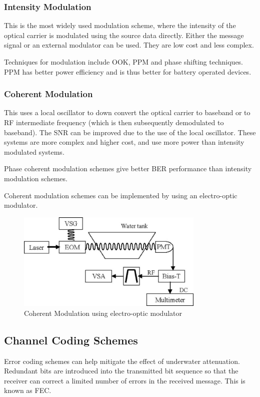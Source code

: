 \documentclass{article}
\begin{document}
\subsubsection{Intensity Modulation}
This is the most widely used modulation scheme, where the intensity of the
optical carrier is modulated using the source data directly. Either the
message signal or an external modulator can be used. They are low cost and
less complex.

Techniques for modulation include \ac{OOK}, \ac{PPM} and phase shifting
techniques. \ac{PPM} has better power efficiency and is thus better for
battery operated devices.

\subsubsection{Coherent Modulation}
This uses a local oscillator to down convert the optical carrier to baseband
or to \ac{RF} intermediate frequency (which is then subsequently demodulated
to baseband). The \ac{SNR} can be improved due to the use of the local
oscillator. These systems are more complex and higher cost, and use more power
than intensity modulated systems.

Phase coherent modulation schemes give better \ac{BER} performance than
intensity modulation schemes.

Coherent modulation schemes can be implemented by using an electro-optic
modulator.

\begin{figure}[H]
  \includegraphics[width=0.8\textwidth]{coherent-source.jpg}
  \caption{Coherent Modulation using electro-optic modulator
	   \cite{cochenour_mullen_laux_2007}}
  \label{fig:boat1}
\end{figure}

\subsection{Channel Coding Schemes}
Error coding schemes can help mitigate the effect of underwater attenuation.
Redundant bits are introduced into the transmitted bit sequence so that the
receiver can correct a limited number of errors in the received message.
This is known as \ac{FEC}.
\end{document}
